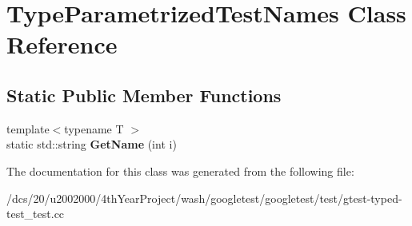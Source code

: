 \hypertarget{classTypeParametrizedTestNames}{}\section{Type\+Parametrized\+Test\+Names Class Reference}
\label{classTypeParametrizedTestNames}
\subsection*{Static Public Member Functions}
\begin{DoxyCompactItemize}
\item 
\mbox{\label{classTypeParametrizedTestNames_a30ba58d5ba65e0727239454ae8364815}} 
{\footnotesize template$<$typename T $>$ }\\static std\+::string {\bfseries Get\+Name} (int i)
\end{DoxyCompactItemize}


The documentation for this class was generated from the following file\+:\begin{DoxyCompactItemize}
\item 
/dcs/20/u2002000/4th\+Year\+Project/wash/googletest/googletest/test/gtest-\/typed-\/test\+\_\+test.\+cc\end{DoxyCompactItemize}
